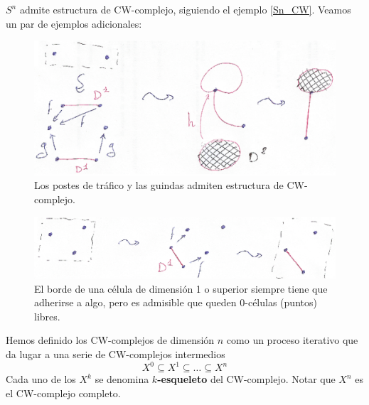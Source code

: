 
\begin{ejem} $S^n$ admite estructura de CW-complejo, siguiendo el ejemplo \ref{Sn_CW}. Veamos un par de ejemplos adicionales:\end{ejem}

\begin{figure}[h]
\centering
\includegraphics[scale=0.7]{Figures/CWej2}
\caption{Los postes de tráfico y las guindas admiten estructura de CW-complejo.}
\end{figure}

\begin{figure}[h]
\centering
\includegraphics[scale=0.7]{Figures/CWej3}
\caption{El borde de una célula de dimensión 1 o superior siempre tiene que adherirse a algo, pero es admisible que queden 0-células (puntos) libres.}
\end{figure}

\newpage
Hemos definido los CW-complejos de dimensión $n$ como un proceso iterativo que da lugar a una serie de CW-complejos intermedios $$X^0 \subseteq X^1 \subseteq \dots \subseteq X^n$$ Cada uno de los $X^k$ se denomina \textbf{$k$-esqueleto} del CW-complejo. Notar que $X^n$ es el CW-complejo completo.


